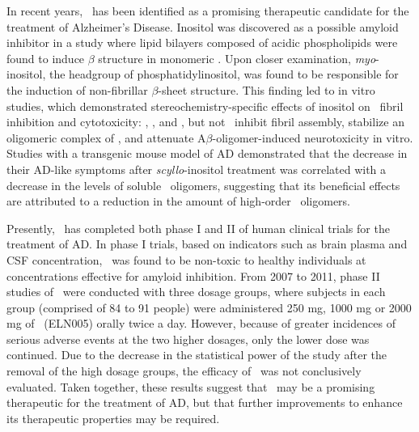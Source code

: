In recent years, \scylloi\ has been identified as a promising therapeutic candidate for the treatment of Alzheimer's Disease. Inositol was discovered as a possible amyloid inhibitor in a study where lipid bilayers composed of acidic phospholipids were found to induce $\beta$ structure in monomeric .\cite{McLaurin:1996p584} Upon closer examination, \emph{myo}-inositol, the headgroup of phosphatidylinositol, was found to be responsible for the induction of non-fibrillar $\beta$-sheet structure.\cite{McLaurin:1998p3976, McLaurin:1998p3149} This finding led to in vitro studies, which demonstrated stereochemistry-specific effects of inositol on \abeta\ fibril inhibition and cytotoxicity: \scyllo, \myo, and \epi, but not \chiroi\ inhibit  fibril assembly, stabilize an oligomeric complex of , and attenuate A$\beta$-oligomer-induced neurotoxicity in vitro.\cite{McLaurin:2000bq} Studies with a transgenic mouse model of AD demonstrated that the decrease in their AD-like symptoms after \emph{scyllo}-inositol treatment was correlated with a decrease in the levels of soluble \abeta\ oligomers, suggesting that its beneficial effects are attributed to a reduction in the amount of high-order \abeta\ oligomers.\cite{McLaurin:2006eb}


Presently, \scylloi\ has completed both phase I and II of human clinical trials for the treatment of AD.\cite{Salloway:2011im} In phase I trials, based on indicators such as brain plasma and CSF concentration, \scylloi\ was found to be non-toxic to healthy individuals at concentrations effective for amyloid inhibition. From 2007 to 2011, phase II studies of \scylloi\ were conducted with three dosage groups, where subjects in each group (comprised of 84 to 91 people) were administered 250 mg, 1000 mg or 2000 mg of \scylloi\ (ELN005) orally twice a day. However, because of greater incidences of serious adverse events at the two higher dosages, only the lower dose was continued. Due to the decrease in the statistical power of the study after the removal of the high dosage groups, the efficacy of \scylloi\ was not conclusively evaluated.\cite{Salloway:2011im} Taken together, these results suggest that \scylloi\ may be a promising therapeutic for the treatment of AD, but that further improvements to enhance its therapeutic properties may be required.\cite{Nitz:2008jl,Sun:2008ko} %

